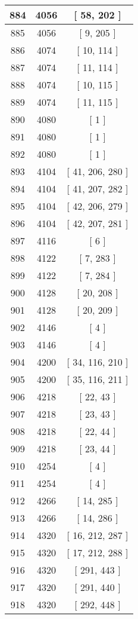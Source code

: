 \begin{center}
\begin{longtable}[H]{|| c c c ||}
\hline
884 & 4056 & [ 58, 202 ] \\ 
\hline
885 & 4056 & [ 9, 205 ] \\ 
\hline
886 & 4074 & [ 10, 114 ] \\ 
\hline
887 & 4074 & [ 11, 114 ] \\ 
\hline
888 & 4074 & [ 10, 115 ] \\ 
\hline
889 & 4074 & [ 11, 115 ] \\ 
\hline
890 & 4080 & [ 1 ] \\ 
\hline
891 & 4080 & [ 1 ] \\ 
\hline
892 & 4080 & [ 1 ] \\ 
\hline
893 & 4104 & [ 41, 206, 280 ] \\ 
\hline
894 & 4104 & [ 41, 207, 282 ] \\ 
\hline
895 & 4104 & [ 42, 206, 279 ] \\ 
\hline
896 & 4104 & [ 42, 207, 281 ] \\ 
\hline
897 & 4116 & [ 6 ] \\ 
\hline
898 & 4122 & [ 7, 283 ] \\ 
\hline
899 & 4122 & [ 7, 284 ] \\ 
\hline
900 & 4128 & [ 20, 208 ] \\ 
\hline
901 & 4128 & [ 20, 209 ] \\ 
\hline
902 & 4146 & [ 4 ] \\ 
\hline
903 & 4146 & [ 4 ] \\ 
\hline
904 & 4200 & [ 34, 116, 210 ] \\ 
\hline
905 & 4200 & [ 35, 116, 211 ] \\ 
\hline
906 & 4218 & [ 22, 43 ] \\ 
\hline
907 & 4218 & [ 23, 43 ] \\ 
\hline
908 & 4218 & [ 22, 44 ] \\ 
\hline
909 & 4218 & [ 23, 44 ] \\ 
\hline
910 & 4254 & [ 4 ] \\ 
\hline
911 & 4254 & [ 4 ] \\ 
\hline
912 & 4266 & [ 14, 285 ] \\ 
\hline
913 & 4266 & [ 14, 286 ] \\ 
\hline
914 & 4320 & [ 16, 212, 287 ] \\ 
\hline
915 & 4320 & [ 17, 212, 288 ] \\ 
\hline
916 & 4320 & [ 291, 443 ] \\ 
\hline
917 & 4320 & [ 291, 440 ] \\ 
\hline
918 & 4320 & [ 292, 448 ] \\ 

\end{longtable}
\end{center}
